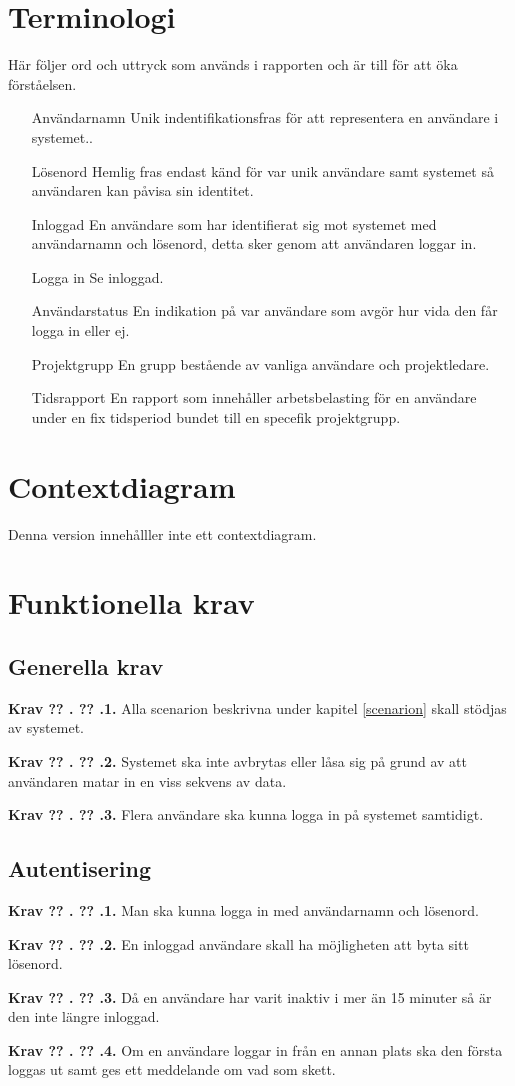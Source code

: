 \documentclass[a4paper]{article}
\newcommand\getcurrentref[1]{%
 \ifnumequal{\value{#1}}{0}
  {??}
  {\the\value{#1}}%
}
\newcommand\requirement[2]{
	\numberedrow{Krav}{#1}{#2}
}
\newcommand\numberedrow[3]{
	\noindent
	\textbf{#1 \getcurrentref{section}.\getcurrentref{subsection}.#2.} #3
	
}
\begin{document}
\section{Terminologi}
Här följer ord och uttryck som används i rapporten och är till för att öka förståelsen.
\begin{itemize}
\item [Användarnamn] Unik indentifikationsfras för att representera en användare i systemet..
\item [Lösenord] Hemlig fras endast känd för var unik användare samt systemet så användaren kan påvisa sin identitet.
\item [Inloggad] En användare som har identifierat sig mot systemet med användarnamn och lösenord, detta sker genom att användaren loggar in.
\item [Logga in] Se inloggad.
\item [Användarstatus] En indikation på var användare som avgör hur vida den får logga in eller ej.
\item [Projektgrupp] En grupp bestående av vanliga användare och projektledare.
\item [Tidsrapport] En rapport som innehåller arbetsbelasting för en användare under en fix tidsperiod bundet till en specefik projektgrupp.
\end{itemize}
\section{Contextdiagram}
Denna version innehålller inte ett contextdiagram.
\section{Funktionella krav}
\subsection{Generella krav}
 \requirement{1}{Alla scenarion beskrivna under kapitel \ref{scenarion} skall stödjas av systemet.}
 \requirement{2}{Systemet ska inte avbrytas eller låsa sig på grund av att användaren matar in en viss sekvens av data.}
 \requirement{3}{Flera användare ska kunna logga in på systemet samtidigt.}
 
\subsection{Autentisering}
\requirement{1}{Man ska kunna logga in med användarnamn och lösenord.}
\requirement{2}{En inloggad användare skall ha möjligheten att byta sitt lösenord.}
\requirement{3}{Då en användare har varit inaktiv i mer än 15 minuter så är den inte längre inloggad.}
\requirement{4}{Om en användare loggar in från en annan plats ska den första loggas ut samt ges ett meddelande om vad som skett.}
\end{document}
